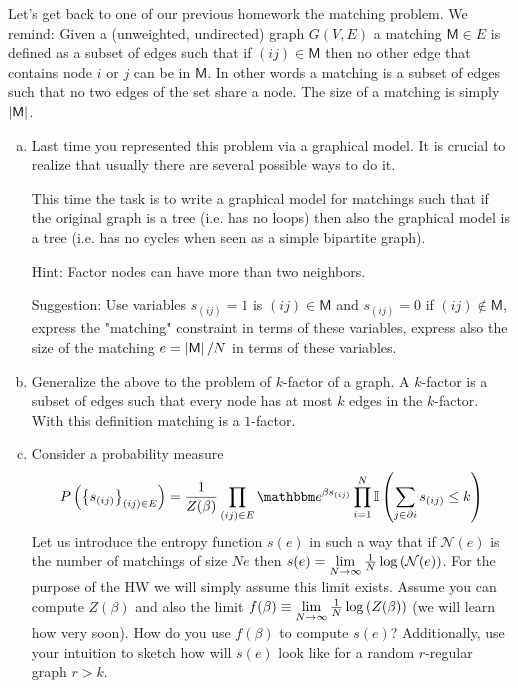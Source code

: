 \documentclass[a4paper,oneside,12pt]{article}
\begin{document}
Let's get back to one of our previous homework the matching problem. 
We remind: Given a  (unweighted, undirected) graph $ G(V,E) $ a matching $ \mathsf{M} \in E $ is defined as a subset of edges such that if $ (ij) \in \mathsf{M} $ then no other edge that contains node $ i $ or $ j $ can be in $ \mathsf{M} $. 
In other words a matching is a subset of edges such that no two edges of the set share a node. 
The size of a matching is simply $ \left| \mathsf{M} \right| $. 
\begin{enumerate}[(a)]
\item 
        Last time you represented this problem via a graphical model. 
        It is crucial to realize that usually there are several possible ways to do it. 

        This time the task is to write a graphical model for matchings such that if the original graph is a tree (i.e. has no loops) then also the graphical model is a tree (i.e. has no cycles when seen as a simple bipartite graph). 

        Hint: Factor nodes can have more than two neighbors. 

        Suggestion: Use variables $ s_{(ij)} = 1 $ is $ (ij) \in \mathsf{M} $ and $ s_{(ij)} = 0 $ if $ (ij) \notin \mathsf{M} $, express the "matching" constraint in terms of these variables, express also the size of the matching $ e = \left| \mathsf{M} \right| / N $ in terms of these variables.   
\item 
        Generalize the above to the problem of $ k $-factor of a graph. 
        A $ k $-factor is a subset of edges such that every node has at most $ k $ edges in the $ k $-factor. 
        With this definition matching is a $ 1 $-factor. 
\item 
        Consider a probability measure 
        \begin{equation}
           P \rdbrs{ \clbrs{ s_{(ij)} }_{(ij) \in E} } = \frac{1}{Z(\beta)} \prod_{(ij) \in E} \ee^{\beta s_{(ij)}} \prod_{i=1}^N \mathbb{I} \rdbrs{ \sum_{j \in \partial i} s_{(ij)} \le k }
        \end{equation}
        Let us introduce the entropy function $ s(e) $ in such a way that if $ \mathcal{N}(e) $ is the number of matchings of size $ N e $ then $ s(e)  = \underset{N \to \infty}{\lim}\, \frac{1}{N} \log \left(  \mathcal{N}(e)  \right) $. 
        For the purpose of the HW we will simply assume this limit exists. 
        Assume you can compute $ Z(\beta) $ and also the limit $ f(\beta) \equiv \underset{N \to \infty}{\lim}\, \frac{1}{N} \log \left(  Z(\beta)  \right) $ (we will learn how very soon). 
        How do you use $ f(\beta) $ to compute $ s(e) $? 
        Additionally, use your intuition to sketch how will $ s(e) $ look like for a random $ r $-regular graph $ r > k $.
\end{enumerate}
\end{document}
